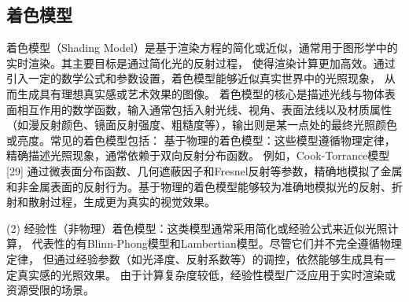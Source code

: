 \subsection{着色模型}

着色模型（Shading Model）是基于渲染方程的简化或近似，通常用于图形学中的实时渲染。其主要目标是通过简化光的反射过程，
使得渲染计算更加高效。通过引入一定的数学公式和参数设置，着色模型能够近似真实世界中的光照现象，
从而生成具有理想真实感或艺术效果的图像。
着色模型的核心是描述光线与物体表面相互作用的数学函数，输入通常包括入射光线、视角、表面法线以及材质属性
（如漫反射颜色、镜面反射强度、粗糙度等），输出则是某一点处的最终光照颜色或亮度。常见的着色模型包括：
基于物理的着色模型：这些模型遵循物理定律，精确描述光照现象，通常依赖于双向反射分布函数。
例如，Cook-Torrance模型[29] 通过微表面分布函数、几何遮蔽因子和Fresnel反射等参数，精确地模拟了金属和非金属表面的反射行为。基于物理的着色模型能够较为准确地模拟光的反射、折射和散射过程，生成更为真实的视觉效果。

(2)	经验性（非物理）着色模型：这类模型通常采用简化或经验公式来近似光照计算，
代表性的有Blinn-Phong模型和Lambertian模型。尽管它们并不完全遵循物理定律，
但通过经验参数（如光泽度、反射系数等）的调控，依然能够生成具有一定真实感的光照效果。
由于计算复杂度较低，经验性模型广泛应用于实时渲染或资源受限的场景。


